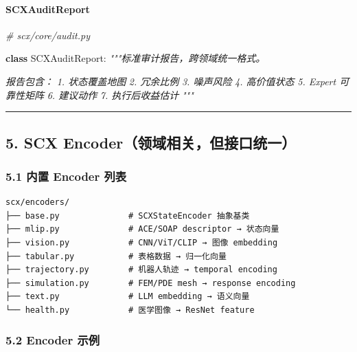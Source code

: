 \documentclass[
  12pt,
]{ctexart}
\newenvironment{Shaded}{}{}
\newcommand{\CommentTok}[1]{\textcolor[rgb]{0.38,0.63,0.69}{\textit{#1}}}
\newcommand{\KeywordTok}[1]{\textcolor[rgb]{0.00,0.44,0.13}{\textbf{#1}}}
\newcommand{\NormalTok}[1]{#1}
\begin{document}
\paragraph{SCXAuditReport}\label{scxauditreport}

\begin{Shaded}
\begin{Highlighting}[]
\CommentTok{\# scx/core/audit.py}

\KeywordTok{class}\NormalTok{ SCXAuditReport:}
    \CommentTok{"""标准审计报告，跨领域统一格式。}

\CommentTok{    报告包含：}
\CommentTok{    1. 状态覆盖地图}
\CommentTok{    2. 冗余比例}
\CommentTok{    3. 噪声风险}
\CommentTok{    4. 高价值状态}
\CommentTok{    5. Expert 可靠性矩阵}
\CommentTok{    6. 建议动作}
\CommentTok{    7. 执行后收益估计}
\CommentTok{    """}
\end{Highlighting}
\end{Shaded}

\begin{center}\rule{0.5\linewidth}{0.5pt}\end{center}

\subsection{5. SCX
Encoder（领域相关，但接口统一）}\label{scx-encoderux9886ux57dfux76f8ux5173ux4f46ux63a5ux53e3ux7edfux4e00}

\subsubsection{5.1 内置 Encoder
列表}\label{ux5185ux7f6e-encoder-ux5217ux8868}

\begin{verbatim}
scx/encoders/
├── base.py              # SCXStateEncoder 抽象基类
├── mlip.py              # ACE/SOAP descriptor → 状态向量
├── vision.py            # CNN/ViT/CLIP → 图像 embedding
├── tabular.py           # 表格数据 → 归一化向量
├── trajectory.py        # 机器人轨迹 → temporal encoding
├── simulation.py        # FEM/PDE mesh → response encoding
├── text.py              # LLM embedding → 语义向量
└── health.py            # 医学图像 → ResNet feature
\end{verbatim}

\subsubsection{5.2 Encoder 示例}\label{encoder-ux793aux4f8b}
\end{document}
